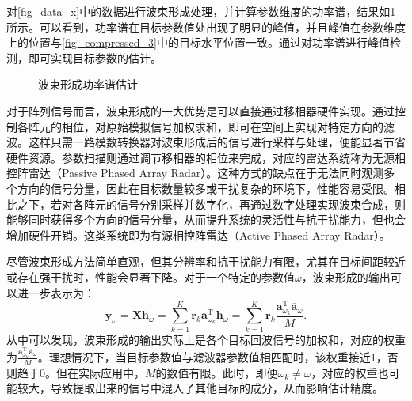 对\cref{fig_data_x}中的数据进行波束形成处理，并计算参数维度的功率谱，结果如\cref{fig_spectrum_cbf}所示。可以看到，功率谱在目标参数值处出现了明显的峰值，并且峰值在参数维度上的位置与\cref{fig_compressed_3}中的目标水平位置一致。通过对功率谱进行峰值检测，即可实现目标参数的估计。

\begin{figure}[htb!]
    \centering
    \caption{波束形成功率谱估计}
    \label{fig_spectrum_cbf}
\end{figure}

对于阵列信号而言，波束形成的一大优势是可以直接通过移相器硬件实现。通过控制各阵元的相位，对原始模拟信号加权求和，即可在空间上实现对特定方向的滤波。这样只需一路模数转换器对波束形成后的信号进行采样与处理，便能显著节省硬件资源。参数扫描则通过调节移相器的相位来完成，对应的雷达系统称为无源相控阵雷达（Passive Phased Array Radar）。这种方式的缺点在于无法同时观测多个方向的信号分量，因此在目标数量较多或干扰复杂的环境下，性能容易受限。相比之下，若对各阵元的信号分别采样并数字化，再通过数字处理实现波束合成，则能够同时获得多个方向的信号分量，从而提升系统的灵活性与抗干扰能力，但也会增加硬件开销。这类系统即为有源相控阵雷达（Active Phased Array Radar）。

尽管波束形成方法简单直观，但其分辨率和抗干扰能力有限，尤其在目标间距较近或存在强干扰时，性能会显著下降。对于一个特定的参数值\( \omega \)，波束形成的输出可以进一步表示为：
\[
    \bm{y}_{\omega} = \mathbf{X} \bm{h}_{\omega} = \sum_{k=1}^{K} \bm{r}_k \bm{a}_{\omega_k}^{\mathrm{T}} \bm{h}_{\omega} = \sum_{k=1}^{K} \bm{r}_k \frac{\bm{a}_{\omega_k}^{\mathrm{T}} \overline{\bm{a}}_{\omega}}{M}.
\]
从中可以发现，波束形成的输出实际上是各个目标回波信号的加权和，对应的权重为\( \frac{\bm{a}_{\omega_k}^{\mathrm{T}} \overline{\bm{a}}_{\omega}}{M} \)。理想情况下，当目标参数值与滤波器参数值相匹配时，该权重接近1，否则趋于0。但在实际应用中，\( M \)的数值有限。此时，即便\( \omega_k \neq \omega \)，对应的权重也可能较大，导致提取出来的信号中混入了其他目标的成分，从而影响估计精度。

